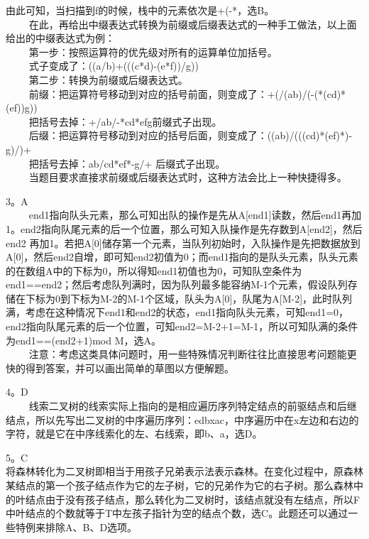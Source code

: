 由此可知，当扫描到f的时候，栈中的元素依次是+(-*，选B。 \\
$\qquad$ 在此，再给出中缀表达式转换为前缀或后缀表达式的一种手工做法，以上面给出的中缀表达式为例： \\
$\qquad$ 第一步：按照运算符的优先级对所有的运算单位加括号。 \\
$\qquad$ 式子变成了：((a/b)+(((c*d)-(e*f))/g)) \\
$\qquad$ 第二步：转换为前缀或后缀表达式。 \\
$\qquad$ 前缀：把运算符号移动到对应的括号前面，则变成了：+(/(ab)/(-(*(cd)*(ef))g))  \\
$\qquad$ 把括号去掉：+/ab/-*cd*efg前缀式子出现。 \\
$\qquad$ 后缀：把运算符号移动到对应的括号后面，则变成了：((ab)/(((cd)*(ef)*)-g)/)+  \\
$\qquad$ 把括号去掉：ab/cd*ef*-g/+ 后缀式子出现。  \\
$\qquad$ 当题目要求直接求前缀或后缀表达式时，这种方法会比上一种快捷得多。

3。A \\
$\qquad$ end1指向队头元素，那么可知出队的操作是先从A[end1]读数，然后end1再加1。end2指向队尾元素的后一个位置，那么可知入队操作是先存数到A[end2]，然后end2 再加1。若把A[0]储存第一个元素，当队列初始时，入队操作是先把数据放到A[0]，然后end2自增，即可知end2初值为0；而end1指向的是队头元素，队头元素的在数组A中的下标为0，所以得知end1初值也为0，可知队空条件为end1==end2；然后考虑队列满时，因为队列最多能容纳M-1个元素，假设队列存储在下标为0到下标为M-2的M-1个区域，队头为A[0]，队尾为A[M-2]，此时队列满，考虑在这种情况下end1和end2的状态，end1指向队头元素，可知end1=0，end2指向队尾元素的后一个位置，可知end2=M-2+1=M-1，所以可知队满的条件为end1==(end2+1)mod M，选A。 \\
$\qquad$ 注意：考虑这类具体问题时，用一些特殊情况判断往往比直接思考问题能更快的得到答案，并可以画出简单的草图以方便解题。

4。D \\
$\qquad$ 线索二叉树的线索实际上指向的是相应遍历序列特定结点的前驱结点和后继结点，所以先写出二叉树的中序遍历序列：edbxac，中序遍历中在x左边和右边的字符，就是它在中序线索化的左、右线索，即b、a，选D。

5。C \\
将森林转化为二叉树即相当于用孩子兄弟表示法表示森林。在变化过程中，原森林某结点的第一个孩子结点作为它的左子树，它的兄弟作为它的右子树。那么森林中的叶结点由于没有孩子结点，那么转化为二叉树时，该结点就没有左结点，所以F中叶结点的个数就等于T中左孩子指针为空的结点个数，选C。此题还可以通过一些特例来排除A、B、D选项。

